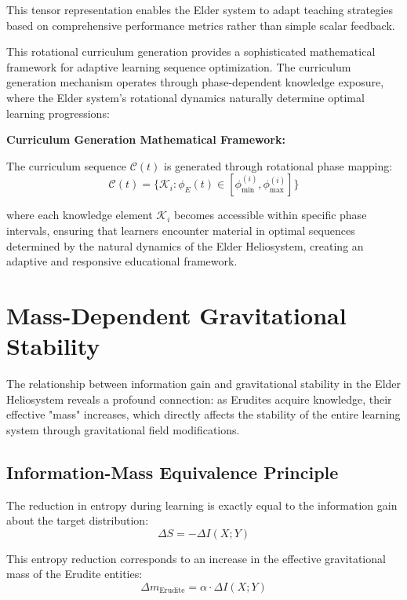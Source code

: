 This tensor representation enables the Elder system to adapt teaching strategies based on comprehensive performance metrics rather than simple scalar feedback.

This rotational curriculum generation provides a sophisticated mathematical framework for adaptive learning sequence optimization. The curriculum generation mechanism operates through phase-dependent knowledge exposure, where the Elder system's rotational dynamics naturally determine optimal learning progressions:

\textbf{Curriculum Generation Mathematical Framework:}

The curriculum sequence $\mathcal{C}(t)$ is generated through rotational phase mapping:
\begin{equation}
\mathcal{C}(t) = \{\mathcal{K}_i : \phi_E(t) \in [\phi_{\min}^{(i)}, \phi_{\max}^{(i)}]\}
\end{equation}

where each knowledge element $\mathcal{K}_i$ becomes accessible within specific phase intervals, ensuring that learners encounter material in optimal sequences determined by the natural dynamics of the Elder Heliosystem, creating an adaptive and responsive educational framework.

\section{Mass-Dependent Gravitational Stability}

The relationship between information gain and gravitational stability in the Elder Heliosystem reveals a profound connection: as Erudites acquire knowledge, their effective "mass" increases, which directly affects the stability of the entire learning system through gravitational field modifications.

\subsection{Information-Mass Equivalence Principle}

The reduction in entropy during learning is exactly equal to the information gain about the target distribution:
\begin{equation}
\Delta S = -\Delta I(X; Y)
\end{equation}

This entropy reduction corresponds to an increase in the effective gravitational mass of the Erudite entities:
\begin{equation}
\Delta m_{\text{Erudite}} = \alpha \cdot \Delta I(X; Y)
\end{equation}

